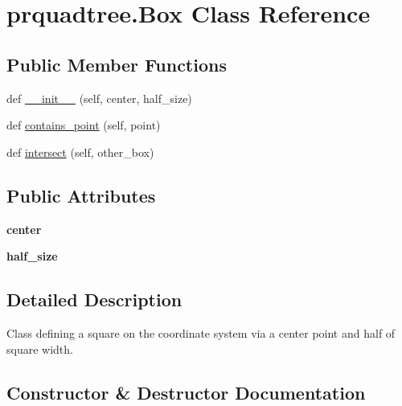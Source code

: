 \hypertarget{classprquadtree_1_1Box}{}\section{prquadtree.\+Box Class Reference}
\label{classprquadtree_1_1Box}
\subsection*{Public Member Functions}
\begin{DoxyCompactItemize}
\item 
def \hyperlink{classprquadtree_1_1Box_a0ff4532e81c55a7b41c35e85b0099168}{\+\_\+\+\_\+init\+\_\+\+\_\+} (self, center, half\+\_\+size)
\item 
def \hyperlink{classprquadtree_1_1Box_a3f8878c3fa9a89b786103d31821304df}{contains\+\_\+point} (self, point)
\item 
def \hyperlink{classprquadtree_1_1Box_af8b0a29f1094809b6ae0793077d51648}{intersect} (self, other\+\_\+box)
\end{DoxyCompactItemize}
\subsection*{Public Attributes}
\begin{DoxyCompactItemize}
\item 
\hypertarget{classprquadtree_1_1Box_a97475b97164cac388fc673e08ce2707e}{}{\bfseries center}\label{classprquadtree_1_1Box_a97475b97164cac388fc673e08ce2707e}

\item 
\hypertarget{classprquadtree_1_1Box_ac40b9c6e566a2ca829a2e84e3f741294}{}{\bfseries half\+\_\+size}\label{classprquadtree_1_1Box_ac40b9c6e566a2ca829a2e84e3f741294}

\end{DoxyCompactItemize}


\subsection{Detailed Description}
\begin{DoxyVerb}Class defining a square on the coordinate system via a center point and
half of square width.
\end{DoxyVerb}
 

\subsection{Constructor \& Destructor Documentation}
\hypertarget{classprquadtree_1_1Box_a0ff4532e81c55a7b41c35e85b0099168}{}
